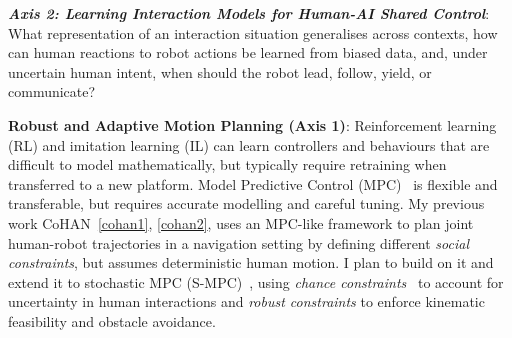 \documentclass[11pt]{article}
\newcommand{\boldheading}[1]{\par\vspace{4pt}{\bfseries #1\par}\vspace{2pt}}
\begin{document}
\vspace{0.5ex}
\noindent \textbf{\textit{Axis 2: Learning Interaction Models for Human-AI Shared Control}}: What representation of an interaction situation generalises across contexts, how can human reactions to robot actions be learned from biased data, and, under uncertain human intent, when should the robot lead, follow, yield, or communicate?

\vspace{0.5ex}
\boldheading{{Methodology}}

\noindent \textbf{{Robust and Adaptive Motion Planning (Axis 1)}}: 
Reinforcement learning (RL) and imitation learning (IL) can learn controllers and behaviours that are difficult to model mathematically, but typically require retraining when transferred to a new platform. Model Predictive Control (MPC)~\cite{kouvaritakis2016model} is flexible and transferable, but requires accurate modelling and careful tuning. My previous work CoHAN~\ref{cohan1}, \ref{cohan2}, uses an MPC-like framework to plan joint human-robot trajectories in a navigation setting by defining different \textit{social constraints}, but assumes deterministic human motion. 
I plan to build on it and extend it to stochastic MPC (S-MPC)~\cite{heirung2018stochastic, zhu2025fusion}, using \textit{chance constraints}~\cite{paulson2020stochastic} to account for uncertainty in human interactions and \textit{robust constraints} to enforce kinematic feasibility and obstacle avoidance.
\end{document}
